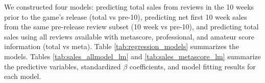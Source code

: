 \documentclass{sig-alternate}
\begin{document}
We constructed four models: predicting total sales from reviews in the 10 weeks prior to the game's release (total vs pre-10), predicting net first 10 week sales from the same pre-release review subset (10 week vs pre-10), and predicting total sales using all reviews available with metascore, professional, and amateur score information (total vs meta). Table \ref{tab:regression_models} summarizes the models. Tables \ref{tab:sales_allmodel_lm} and \ref{tab:sales_metascore_lm} summarize the predictive variables, standardized $\beta$ coefficients, and model fitting results for each model.
\end{document}
